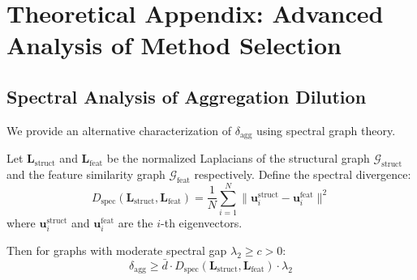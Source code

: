 \section{Theoretical Appendix: Advanced Analysis of Method Selection}
\label{sec:theorem4_appendix}


\subsection{Spectral Analysis of Aggregation Dilution}

We provide an alternative characterization of $\delta_{\text{agg}}$ using spectral graph theory.

\begin{theorem}
\label{thm:spectral_dilution}
Let $\mathbf{L}_{\text{struct}}$ and $\mathbf{L}_{\text{feat}}$ be the normalized Laplacians of the structural graph $\mathcal{G}_{\text{struct}}$ and the feature similarity graph $\mathcal{G}_{\text{feat}}$ respectively. Define the spectral divergence:
\begin{equation}
D_{\text{spec}}(\mathbf{L}_{\text{struct}}, \mathbf{L}_{\text{feat}}) = \frac{1}{N}\sum_{i=1}^N \|\mathbf{u}_i^{\text{struct}} - \mathbf{u}_i^{\text{feat}}\|^2
\end{equation}
where $\mathbf{u}_i^{\text{struct}}$ and $\mathbf{u}_i^{\text{feat}}$ are the $i$-th eigenvectors.

Then for graphs with moderate spectral gap $\lambda_2 \geq c > 0$:
\begin{equation}
\delta_{\text{agg}} \geq \bar{d} \cdot D_{\text{spec}}(\mathbf{L}_{\text{struct}}, \mathbf{L}_{\text{feat}}) \cdot \lambda_2
\end{equation}
\end{theorem}

